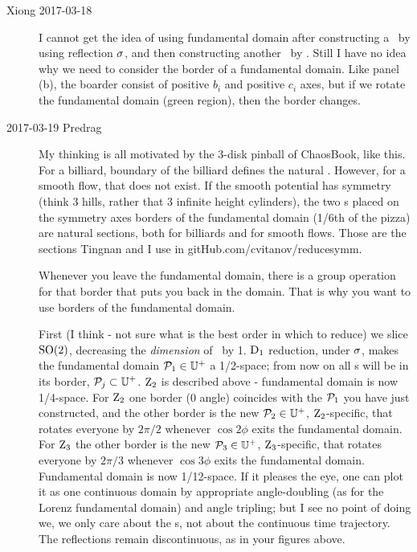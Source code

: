 \begin{description}
\item[Xiong 2017-03-18]
I cannot get the idea of using  fundamental domain after
constructing a \PoincSec\ by using reflection $\sigma$, and then
constructing another \PoincSec\ by .
Still I have no idea why we need to
consider the border of a fundamental domain. Like panel (b),
the boarder consist of positive $b_i$ and positive $c_i$ axes,
but if we rotate the fundamental domain (green region), then
the border changes.


\item[2017-03-19 Predrag]
My thinking is all motivated by the 3-disk pinball of ChaosBook, like this.
For a billiard, boundary of the billiard defines the natural \PoincSec.
However, for a smooth flow, that does not exist. If the smooth potential
has  symmetry (think 3 hills, rather that 3 infinite height cylinders),
the two
\PoincSec s placed on the symmetry axes borders of the fundamental
domain (1/6th of the pizza) are natural sections, both for billiards and for
smooth flows. Those are the sections Tingnan and I use in
 {gitHub.com/cvitanov/reducesymm}.

Whenever you leave the fundamental domain, there is a group operation for
that border that puts you back in the domain. That is why you want to use
borders of the fundamental domain.

First (I think - not sure what is the best order in which to reduce) we
slice $\textrm{SO}(2)$, decreasing the \emph{dimension} of \statesp\ by 1.
$\textrm{D}_{1}$ reduction, under $\sigma$, makes the fundamental domain
$\mathcal{P}_1 \in \mathbb{U}^+$ a
1/2-space; from now on all \PoincSec s will be in its border,
$\mathcal{P}_j \subset \mathbb{U}^+$.
$\textrm{Z}_{2}$ is described above - fundamental domain is now 1/4-space. For
$\textrm{Z}_{2}$ one border (0 angle) coincides with the $\mathcal{P}_1$ you have just
constructed, and the other border is the new
$\mathcal{P}_2 \in \mathbb{U}^+$, $\textrm{Z}_{2}$-specific, that
rotates everyone by $2\pi/2$ whenever $\cos 2\phi$ exits the fundamental
domain.
For $\textrm{Z}_{3}$ the other border is the new $\mathcal{P}_3 \in \mathbb{U}^+$,
$\textrm{Z}_{3}$-specific, that rotates everyone by $2\pi/3$ whenever $\cos
3\phi$ exits the fundamental domain.
Fundamental domain is now 1/12-space. If it pleases the eye, one can plot
it as one continuous domain by appropriate angle-doubling (as for the
Lorenz fundamental domain) and angle tripling; but I see no point of
doing we, we only care about the \PoincSec s, not about the continuous
time trajectory. The reflections remain discontinuous, as in your figures
above.


\end{description}
